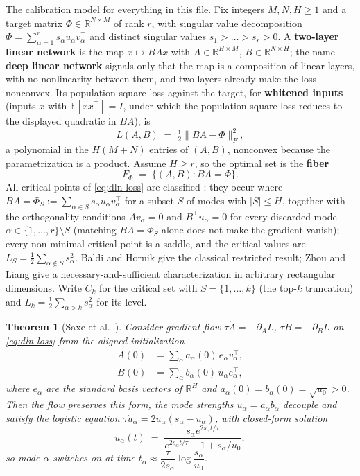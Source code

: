 \documentclass[11pt]{amsart}
\theoremstyle{plain}
\newtheorem{theorem}{Theorem}[section]
\theoremstyle{definition}
\newcommand{\R}{\mathbb{R}}
\newcommand{\E}{\mathbb{E}}
\begin{document}
The calibration model for everything in this file. Fix integers $M, N, H \ge 1$ and a target matrix $\Phi \in \R^{N \times M}$ of rank $r$, with singular value decomposition $\Phi = \sum_{\alpha = 1}^{r} s_\alpha u_\alpha v_\alpha^{\top}$ and distinct singular values $s_1 > \dots > s_r > 0$. A \textbf{two-layer linear network} is the map $x \mapsto BAx$ with $A \in \R^{H \times M}$, $B \in \R^{N \times H}$; the name \textbf{deep linear network} signals only that the map is a composition of linear layers, with no nonlinearity between them, and two layers already make the loss nonconvex. Its population square loss against the target, for \textbf{whitened inputs} (inputs $x$ with $\E[xx^\top] = I$, under which the population square loss reduces to the displayed quadratic in $BA$), is
\begin{equation}\label{eq:dln-loss}
   L(A, B) \;=\; \tfrac12 \| BA - \Phi \|_F^2 ,
\end{equation}
a polynomial in the $H(M+N)$ entries of $(A,B)$, nonconvex because the parametrization is a product. Assume $H \ge r$, so the optimal set is the \textbf{fiber}
\[
   F_\Phi \;=\; \{ (A,B) : BA = \Phi \} .
\]
All critical points of \eqref{eq:dln-loss} are classified \cite{baldi1989,zhou2017}: they occur where $BA = \Phi_S := \sum_{\alpha \in S} s_\alpha u_\alpha v_\alpha^{\top}$ for a subset $S$ of modes with $|S| \le H$, together with the orthogonality conditions $A v_\alpha = 0$ and $B^{\top} u_\alpha = 0$ for every discarded mode $\alpha \in \{1, \dots, r\} \setminus S$ (matching $BA = \Phi_S$ alone does not make the gradient vanish); every non-minimal critical point is a saddle, and the critical values are $L_S = \tfrac12 \sum_{\alpha \notin S} s_\alpha^2$. Baldi and Hornik give the classical restricted result; Zhou and Liang give a necessary-and-sufficient characterization in arbitrary rectangular dimensions. Write $C_k$ for the critical set with $S = \{1, \dots, k\}$ (the top-$k$ truncation) and $L_k = \tfrac12 \sum_{\alpha > k} s_\alpha^2$ for its level.

\begin{theorem}[Saxe et al.~\cite{saxe2014}]\label{thm:saxe}
Consider gradient flow $\tau \dot A = -\partial_A L$, $\tau \dot B = -\partial_B L$ on \eqref{eq:dln-loss} from the aligned initialization
\[
\begin{aligned}
A(0)&=\sum_\alpha a_\alpha(0)\,e_\alpha v_\alpha^{\top},\\
B(0)&=\sum_\alpha b_\alpha(0)\,u_\alpha e_\alpha^{\top},
\end{aligned}
\]
where $e_\alpha$ are the standard basis vectors of $\R^H$ and $a_\alpha(0)=b_\alpha(0)=\sqrt{u_0}>0$. Then the flow preserves this form, the mode strengths $u_\alpha = a_\alpha b_\alpha$ decouple and satisfy the logistic equation $\tau \dot u_\alpha = 2 u_\alpha (s_\alpha - u_\alpha)$, with closed-form solution
\[
   u_\alpha(t) \;=\; \frac{s_\alpha e^{2 s_\alpha t/\tau}}{e^{2 s_\alpha t/\tau} - 1 + s_\alpha / u_0},
\]
so mode $\alpha$ switches on at time $t_\alpha \approx \dfrac{\tau}{2 s_\alpha} \log \dfrac{s_\alpha}{u_0}$.
\end{theorem}
\end{document}
